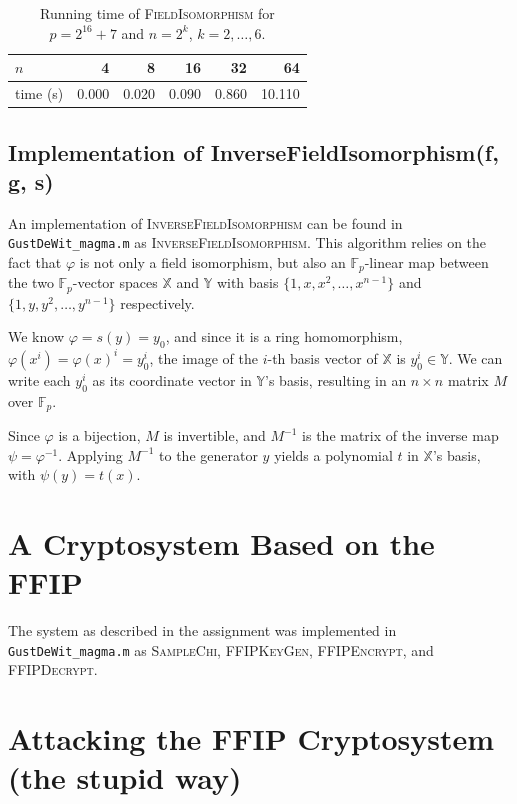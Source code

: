 \documentclass{article}
\begin{document}
\begin{table}[h]
\centering
\begin{tabular}{l|rrrrr}
\hline
$n$ & 4 & 8 & 16 & 32 & 64 \\
\hline
time (s) & 0.000 & 0.020 & 0.090 & 0.860 & 10.110 \\
\hline
\end{tabular}
\caption{Running time of \textsc{FieldIsomorphism} for $p=2^{16}+7$ and
$n=2^k$, $k=2,\dots,6$.}
\label{tab:timings}
\end{table}

\subsection{Implementation of InverseFieldIsomorphism(f, g, s)}
\label{InverseFieldIsomorphism}
An implementation of \textsc{InverseFieldIsomorphism} can be found in \texttt{GustDeWit\_magma.m} as \textsc{InverseFieldIsomorphism}. This algorithm relies on the fact that $\varphi$ is not only a field isomorphism, but also an $\mathbb{F}_p$-linear map between the two $\mathbb{F}_p$-vector spaces $\mathbb{X}$ and $\mathbb{Y}$ with basis $\{1, x, x^2, \dots, x^{n-1}\}$ and $\{1, y, y^2, \dots, y^{n-1}\}$ respectively.

We know $\varphi = s(y) = y_0$, and since it is a ring homomorphism, $\varphi(x^i) = \varphi(x)^i = y_0^i$, the image of the $i$-th basis vector of $\mathbb{X}$ is $y_0^i \in \mathbb{Y}$. We can write each $y_0^i$ as its coordinate vector in $\mathbb{Y}$'s basis, resulting in an $n \times n$ matrix $M$ over $\mathbb{F}_p$.

Since $\varphi$ is a bijection, $M$ is invertible, and $M^{-1}$ is the matrix of the inverse map $\psi = \varphi^{-1}$. Applying $M^{-1}$ to the generator $y$ yields a polynomial $t$ in $\mathbb{X}$'s basis, with $\psi(y) = t(x)$.

\section{A Cryptosystem Based on the FFIP}
The system as described in the assignment was implemented in \texttt{GustDeWit\_magma.m} as \textsc{SampleChi, FFIPKeyGen, FFIPEncrypt}, and \textsc{FFIPDecrypt}.


\section{Attacking the FFIP Cryptosystem (the stupid way)}
\end{document}
